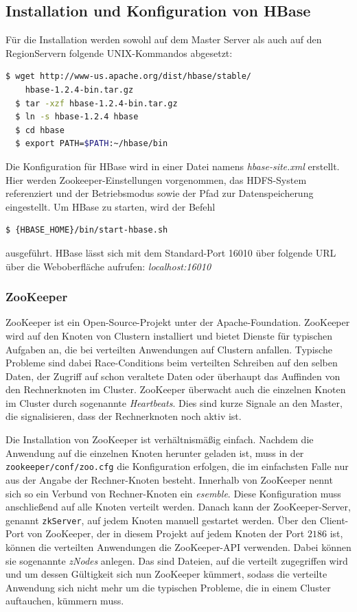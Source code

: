 \subsection{Installation und Konfiguration von HBase}
Für die Installation werden sowohl auf dem Master Server als auch auf den RegionServern folgende UNIX-Kommandos abgesetzt:
\noindent 
\begin{lstlisting}[language=bash]
  $ wget http://www-us.apache.org/dist/hbase/stable/
    hbase-1.2.4-bin.tar.gz
  $ tar -xzf hbase-1.2.4-bin.tar.gz
  $ ln -s hbase-1.2.4 hbase
  $ cd hbase
  $ export PATH=$PATH:~/hbase/bin
\end{lstlisting}

Die Konfiguration für HBase wird in einer Datei namens \textit{hbase-site.xml} erstellt. Hier werden Zookeeper-Einstellungen vorgenommen, das HDFS-System referenziert und der Betriebsmodus sowie der Pfad zur Datenspeicherung eingestellt.
Um HBase zu starten, wird der Befehl 
\noindent 
\begin{lstlisting}[language=bash]
  $ {HBASE_HOME}/bin/start-hbase.sh 
\end{lstlisting}
ausgeführt. HBase lässt sich mit dem Standard-Port 16010 über folgende \ac{URL} über die Weboberfläche aufrufen: \textit{localhost:16010}

\subsubsection{ZooKeeper}
ZooKeeper ist ein Open-Source-Projekt unter der Apache-Foundation. ZooKeeper wird auf den Knoten von Clustern installiert und bietet 
Dienste für typischen Aufgaben an, die bei verteilten Anwendungen auf Clustern anfallen. Typische Probleme sind dabei Race-Conditions 
beim verteilten Schreiben auf den selben Daten, der Zugriff auf schon veraltete Daten oder überhaupt das Auffinden von den Rechnerknoten im
Cluster. ZooKeeper überwacht auch die einzelnen Knoten im Cluster durch sogenannte \textit{Heartbeats}. Dies sind kurze Signale an den Master,
die signalisieren, dass der Rechnerknoten noch aktiv ist. 

Die Installation von ZooKeeper ist verhältnismäßig einfach. Nachdem die Anwendung auf die einzelnen Knoten herunter geladen ist, muss in der 
\newline \texttt{zookeeper/conf/zoo.cfg}
die Konfiguration erfolgen, die im einfachsten Falle nur aus der Angabe der Rechner-Knoten besteht. Innerhalb von ZooKeeper nennt sich so ein Verbund
von Rechner-Knoten ein \textit{esemble}. Diese Konfiguration muss anschließend auf alle Knoten verteilt werden. Danach kann der ZooKeeper-Server, genannt \texttt{zkServer},
auf jedem Knoten manuell gestartet werden. Über den Client-Port von ZooKeeper, der in diesem Projekt auf jedem Knoten der Port $2186$ ist, können die verteilten
Anwendungen die ZooKeeper-API verwenden. Dabei können sie sogenannte \textit{zNodes} anlegen. Das sind Dateien, auf die verteilt zugegriffen wird und um dessen
Gültigkeit sich nun ZooKeeper kümmert, sodass die verteilte Anwendung sich nicht mehr um die typischen Probleme, die in einem Cluster auftauchen, kümmern muss.

